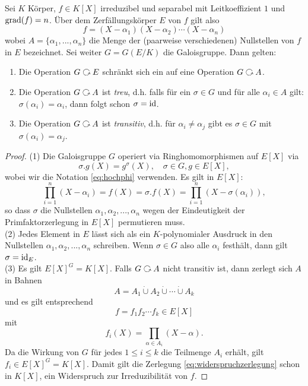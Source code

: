 \documentclass{book}
\begin{document}
\begin{thm}
    \label{thm:galop}
        Sei $K$ Körper, $f \in K[X]$ irreduzibel und separabel mit Leitkoeffizient $1$ und $\operatorname{grad}(f)
        = n$. Über dem Zerfällungskörper $E$ von $f$ gilt also
        \[
            f = (X-\alpha_1)(X-\alpha_2)\cdots (X-\alpha_n)
        \]
        wobei $A = \{ \alpha_1, ..., \alpha_n \}$ die Menge der (paarweise
        verschiedenen) Nullstellen von $f$ in $E$ bezeichnet. Sei weiter $G =
        G(E/K)$ die Galoisgruppe. Dann gelten:
        \begin{enumerate}
            \item Die Operation $G \actson E$ schränkt sich ein auf eine Operation $G \actson A$. 
            \item {}Die Operation $G \actson A$ ist \emph{treu}, d.h. falls für
                ein $\sigma \in G$ und für alle $\alpha_i \in A$ gilt:
                $\sigma(\alpha_i) = \alpha_i$, dann folgt schon $\sigma = \operatorname{id}$. 
            \item Die Operation $G \actson A$ ist \emph{transitiv}, d.h. für
                $\alpha_i \neq \alpha_j$ gibt es $\sigma \in G$ mit
                $\sigma(\alpha_i) = \alpha_j$.
        \end{enumerate}
\end{thm}
\begin{proof}
    (1) Die Galoisgruppe $G$ operiert via Ringhomomorphismen auf $E[X]$ via 
    \[
        \sigma.g(X) = g^{\sigma}(X), \quad \sigma \in G, g \in E[X],
    \]
    wobei wir die Notation \ref{eq:hochphi} verwenden. Es gilt in $E[X]$:
    \[
        \prod_{i=1}^n (X - \alpha_i) = f(X) = \sigma.f(X) = \prod_{i=1}^n (X - \sigma(\alpha_i)),
    \]
    so dass $\sigma$ die Nullstellen $\alpha_1, \alpha_2, ..., \alpha_n$ wegen
    der Eindeutigkeit der Primfaktorzerlegung in $E[X]$ permutieren muss.\\

    \noindent
    (2) Jedes Element in $E$ lässt sich als ein $K$-polynomialer Ausdruck in
    den Nullstellen $\alpha_1, \alpha_2, ..., \alpha_n$ schreiben. Wenn $\sigma
    \in G$ also alle $\alpha_i$ festhält, dann gilt $\sigma = \operatorname{id}_E$.\\

    \noindent
    (3) Es gilt $E[X]^G = K[X]$. Falls $G \actson A$ nicht transitiv ist, dann
    zerlegt sich $A$ in Bahnen
    \[
        A = A_1 \dot{\cup} A_2 \dot{\cup} \cdots \dot{\cup} A_k
    \]
    und es gilt entsprechend
    \begin{equation}
        \label{eq:widerspruchzerlegung}
        f = f_1 f_2 \cdots f_k \in E[X]
    \end{equation}
    mit 
    \[
        f_i(X) = \prod_{\alpha \in A_i} (X - \alpha).
    \]
    Da die Wirkung von $G$ für jedes $1 \le i \le k$ die Teilmenge $A_i$
    erhält, gilt $f_i \in E[X]^G = K[X]$. Damit gilt die Zerlegung
    \eqref{eq:widerspruchzerlegung} schon in $K[X]$, ein Widerspruch zur
    Irreduzibilität von $f$. 
\end{proof}
\end{document}
